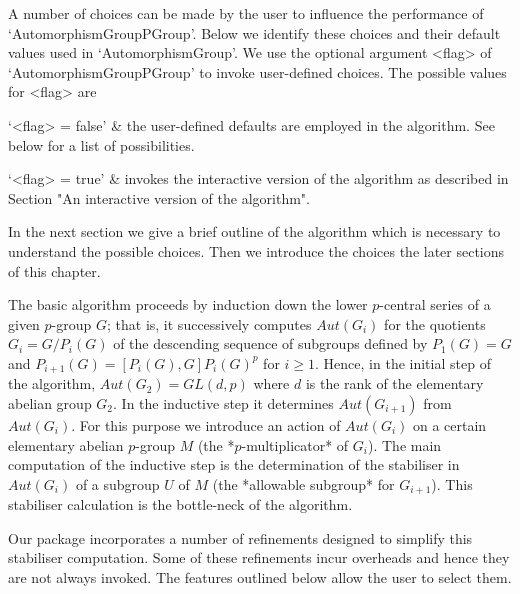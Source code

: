 

A number of choices can be made by the user to influence the performance 
of `AutomorphismGroupPGroup'. Below we identify these choices 
and their default values used in `AutomorphismGroup'. We use the optional
argument <flag> of `AutomorphismGroupPGroup' to invoke user-defined choices.
The possible values for <flag> are

\beginitems
`<flag> = false' & the user-defined defaults are employed in the algorithm.
                 See below for a list of possibilities.

`<flag> = true'  & invokes the interactive version of the algorithm
                 as described in Section "An interactive version of
                 the algorithm".
\enditems

In the next section we give a brief outline of the algorithm which is 
necessary to understand the possible choices. Then we introduce the 
choices the later sections of this chapter.


The basic algorithm proceeds by induction 
down the lower $p$-central series of a given $p$-group $G$; that is, it 
successively computes $Aut(G_i)$ for the quotients $G_i = G / P_i(G)$ of 
the descending sequence of subgroups defined by $P_1(G) = G$ and 
$P_{i+1}(G)=[P_i(G),G] P_i(G)^p$ for $i\geq 1$. Hence, in the initial 
step of the algorithm, $Aut(G_2) = GL(d,p)$ where $d$ is the rank of 
the elementary abelian group $G_2$. In the inductive step it determines 
$Aut(G_{i+1})$ from $Aut(G_i)$. For this purpose we introduce
an action of $Aut(G_i)$ on a certain elementary abelian $p$-group $M$ 
(the *$p$-multiplicator* of $G_i$). The main computation of the inductive 
step is the determination of the stabiliser in $Aut(G_i)$ of a subgroup 
$U$ of $M$ (the *allowable subgroup* for $G_{i+1}$). This stabiliser 
calculation is the bottle-neck of the algorithm.

Our package incorporates a number of refinements designed to simplify
this stabiliser computation. Some of these refinements incur overheads
and hence they are not always invoked. The features outlined below 
allow the user to select them. 

